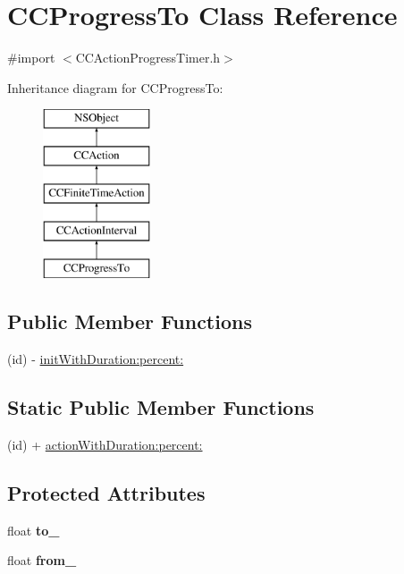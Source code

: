 \hypertarget{interface_c_c_progress_to}{\section{C\-C\-Progress\-To Class Reference}
\label{interface_c_c_progress_to}
}


{\ttfamily \#import $<$C\-C\-Action\-Progress\-Timer.\-h$>$}

Inheritance diagram for C\-C\-Progress\-To\-:\begin{figure}[H]
\begin{center}
\leavevmode
\includegraphics[height=5.000000cm]{interface_c_c_progress_to}
\end{center}
\end{figure}
\subsection*{Public Member Functions}
\begin{DoxyCompactItemize}
\item 
(id) -\/ \hyperlink{interface_c_c_progress_to_ae15a134e782d4c80839ed5076ede0504}{init\-With\-Duration\-:percent\-:}
\end{DoxyCompactItemize}
\subsection*{Static Public Member Functions}
\begin{DoxyCompactItemize}
\item 
(id) + \hyperlink{interface_c_c_progress_to_ad24e37a25ee762a3b623e36061638e54}{action\-With\-Duration\-:percent\-:}
\end{DoxyCompactItemize}
\subsection*{Protected Attributes}
\begin{DoxyCompactItemize}
\item 
\hypertarget{interface_c_c_progress_to_ab5a58e7ef4984739b4f649e8320124c1}{float {\bfseries to\-\_\-}}\label{interface_c_c_progress_to_ab5a58e7ef4984739b4f649e8320124c1}

\item 
\hypertarget{interface_c_c_progress_to_a4068cd21968acb3151d8eaa150b6b706}{float {\bfseries from\-\_\-}}\label{interface_c_c_progress_to_a4068cd21968acb3151d8eaa150b6b706}

\end{DoxyCompactItemize}



